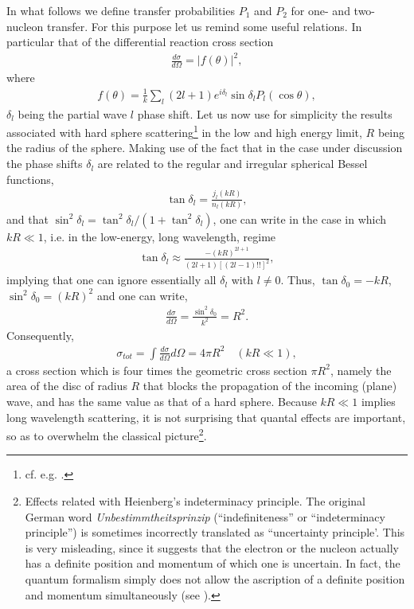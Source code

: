In what follows we define transfer probabilities $P_{1}$ and $P_{2}$ for one- and two-nucleon transfer. For this purpose let us remind some useful relations. In particular that of the differential reaction cross section 
\begin{align}
\frac{d\sigma}{d\Omega}=|f(\theta)|^2,
\end{align}
where
\begin{align}
f(\theta)=\frac{1}{k}\sum_l(2l+1)e^{i\delta_l}\sin\delta_lP_l(\cos\theta),
\end{align}
$\delta_l$ being the partial wave $l$ phase shift. Let us now use for simplicity the results associated with hard sphere scattering\footnote{cf. e.g. \cite{Sakurai:94}.} in the low and high energy limit, $R$ being the radius of the sphere. Making use of the fact that in the case under discussion the phase shifts $\delta_l$ are related to the regular and irregular spherical Bessel functions,
\begin{align}\label{eq3.2.8}
\tan\delta_l=\frac{j_l(kR)}{n_l(kR)},
\end{align}
and that $\sin^2\delta_l=\tan^2\delta_l/(1+\tan^2\delta_l)$,  one can write in the case in which $kR\ll1$, i.e. in the low-energy, long wavelength, regime
\begin{align}
\tan\delta_l\approx\frac{-(kR)^{2l+1}}{(2l+1)[(2l-1)!!]^2},
\end{align}
implying that one can ignore essentially all $\delta_l$ with $l\neq0$. Thus, $\tan\delta_0=-k R$, $\sin^2\delta_0=(kR)^2$ and one can write,
\begin{align}
\frac{d\sigma}{d\Omega}=\frac{\sin^2\delta_0}{k^2}=R^2.
\end{align}
Consequently,
\begin{align}
\sigma_{tot}=\int\frac{d\sigma}{d\Omega}d\Omega=4\pi R^2\quad(kR\ll1),
\end{align}
a cross section which is four times the geometric cross section $\pi R^2$, namely the area of the disc of radius $R$ that blocks the propagation of the incoming (plane) wave, and has the same value as that of a hard sphere. Because $kR\ll1$  
implies long wavelength scattering, it is not surprising that quantal effects are important, so as to overwhelm the classical picture\footnote{Effects related with Heienberg's indeterminacy principle. The original German word \textit{Unbestimmtheitsprinzip} (``indefiniteness'' or ``indeterminacy principle'') is sometimes incorrectly translated as ``uncertainty principle'. This is very misleading, since it suggests that the electron or the nucleon actually has a definite position and momentum of which one is uncertain. In fact, the quantum formalism simply does not allow the ascription of a definite position and momentum simultaneously (see \cite{Leggett:87}).}. 


